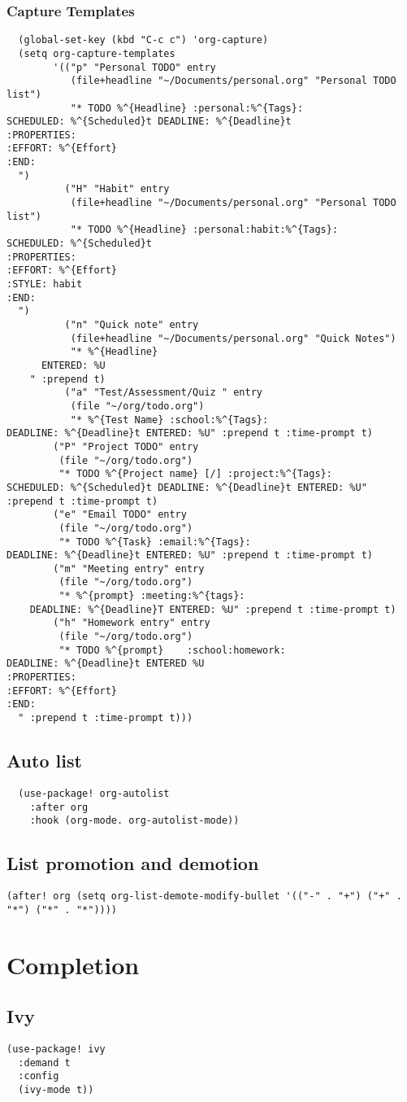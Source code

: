 \documentclass[11pt]{article}
\begin{document}
\subsubsection{Capture Templates}
\label{sec:org3638a66}
\begin{verbatim}
  (global-set-key (kbd "C-c c") 'org-capture)
  (setq org-capture-templates
        '(("p" "Personal TODO" entry
           (file+headline "~/Documents/personal.org" "Personal TODO list")
           "* TODO %^{Headline} :personal:%^{Tags}:
SCHEDULED: %^{Scheduled}t DEADLINE: %^{Deadline}t
:PROPERTIES:
:EFFORT: %^{Effort}
:END:
  ")
          ("H" "Habit" entry
           (file+headline "~/Documents/personal.org" "Personal TODO list")
           "* TODO %^{Headline} :personal:habit:%^{Tags}:
SCHEDULED: %^{Scheduled}t
:PROPERTIES:
:EFFORT: %^{Effort}
:STYLE: habit
:END:
  ")
          ("n" "Quick note" entry
           (file+headline "~/Documents/personal.org" "Quick Notes")
           "* %^{Headline}
      ENTERED: %U
    " :prepend t)
          ("a" "Test/Assessment/Quiz " entry
           (file "~/org/todo.org")
           "* %^{Test Name} :school:%^{Tags}:
DEADLINE: %^{Deadline}t ENTERED: %U" :prepend t :time-prompt t)
        ("P" "Project TODO" entry
         (file "~/org/todo.org")
         "* TODO %^{Project name} [/] :project:%^{Tags}:
SCHEDULED: %^{Scheduled}t DEADLINE: %^{Deadline}t ENTERED: %U" :prepend t :time-prompt t)
        ("e" "Email TODO" entry
         (file "~/org/todo.org")
         "* TODO %^{Task} :email:%^{Tags}:
DEADLINE: %^{Deadline}t ENTERED: %U" :prepend t :time-prompt t)
        ("m" "Meeting entry" entry
         (file "~/org/todo.org")
         "* %^{prompt} :meeting:%^{tags}:
    DEADLINE: %^{Deadline}T ENTERED: %U" :prepend t :time-prompt t)
        ("h" "Homework entry" entry
         (file "~/org/todo.org")
         "* TODO %^{prompt}    :school:homework:
DEADLINE: %^{Deadline}t ENTERED %U
:PROPERTIES:
:EFFORT: %^{Effort}
:END:
  " :prepend t :time-prompt t)))
\end{verbatim}
\subsection{Auto list}
\label{sec:org9d4ac9a}
\begin{verbatim}
  (use-package! org-autolist
    :after org
    :hook (org-mode. org-autolist-mode))
\end{verbatim}

\subsection{List promotion and demotion}
\label{sec:org1228362}
\begin{verbatim}
(after! org (setq org-list-demote-modify-bullet '(("-" . "+") ("+" . "*") ("*" . "*"))))
\end{verbatim}

\section{Completion}
\label{sec:orgfb7bdb5}

\subsection{Ivy}
\label{sec:org6ff5288}
\begin{verbatim}
(use-package! ivy
  :demand t
  :config
  (ivy-mode t))
\end{verbatim}
\end{document}
